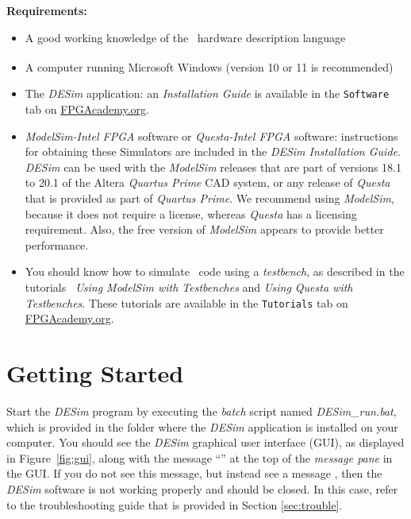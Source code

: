 {\bf Requirements:}
\vspace{-1em}
\begin{itemize}
	\item A good working knowledge of the \hdlName~hardware description 
    language\ifnotSV{}\fi
\item A computer running Microsoft\textsuperscript{\textregistered}
Windows\textsuperscript{\textregistered} (version 10 or 11 is
recommended)\fi
\item The {\it DESim} application: an {\it Installation Guide} 
is available in the \texttt{Software} tab on 
\href{https://www.fpgacademy.org/tools.html}{FPGAcademy.org}.
\item 
{\it ModelSim-Intel FPGA} software or {\it Questa-Intel FPGA} software: instructions for 
obtaining these Simulators are included in the {\it DESim Installation Guide}. {\it DESim} can 
be used with the {\it ModelSim} releases that are part of versions 18.1 to 20.1 of the 
Altera {\it Quartus Prime} CAD system, or any release of {\it Questa} that is provided as
part of {\it Quartus Prime}. We recommend using {\it ModelSim}, because it does not require a
license, whereas {\it Questa} has a licensing requirement. Also, the free version of 
{\it ModelSim} appears to provide better performance.
\item You should know how to simulate \hdlName~code using a {\it testbench}, as described
in the tutorials
{\it~Using ModelSim with Testbenches} and {\it Using Questa with
Testbenches}. These tutorials are available in the \texttt{Tutorials} tab on
\href{https://www.fpgacademy.org/tutorials.html}{FPGAcademy.org}.
\end{itemize}

\newpage

\section{Getting Started}
\label{sec:getting_started}
Start the {\it DESim} program by executing the {\it batch} script named {\it DESim\_run.bat},
which is provided in the folder where the {\it DESim} application is installed on your computer. 
You should see the {\it DESim} graphical user interface (GUI), as displayed in 
Figure~\ref{fig:gui}, along with the message ``'' at 
the top of the {\it message pane} in the GUI. If you do not see this message, but instead 
see a message , then the {\it DESim} software is not working
properly and should be closed. In this case, refer to the troubleshooting guide that is
provided in Section \ref{sec:trouble}.

